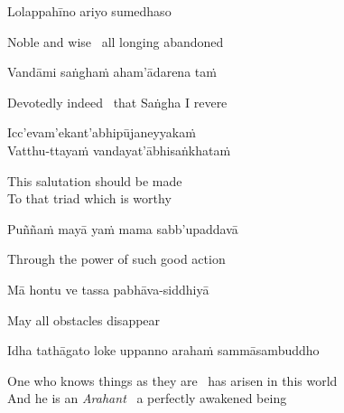 Lolappahīno ariyo sumedhaso

\begin{english}
  Noble and wise \breathmark\ all longing abandoned
\end{english}

Vandāmi saṅghaṁ aham'ādarena taṁ

\begin{english}
  Devotedly indeed \breathmark\ that Saṅgha I revere
\end{english}

Icc'evam'ekant'abhipūjaneyyakaṁ\\
Vatthu-ttayaṁ vandayat'ābhisaṅkhataṁ

\begin{english}
  This salutation should be made\\
  To that triad\ifdigitalversion\makeatletter\hyperlink{endnote11-appendix}\makeatother\fi
  which is worthy
\end{english}

Puññaṁ mayā yaṁ mama sabb'upaddavā

\begin{english}
  Through the power of such good action
\end{english}

Mā hontu ve tassa pabhāva-siddhiyā

\begin{english}
  May all obstacles disappear
\end{english}

Idha tathāgato loke uppanno arahaṁ sammāsambuddho

\begin{english}
  One who knows things as they are \breathmark\ has arisen in this world\makeatletter\hyperlink{endnote12-appendix}\makeatother\\

  And he is an \textit{Arahant} \breathmark\ a perfectly awakened being
\end{english}

